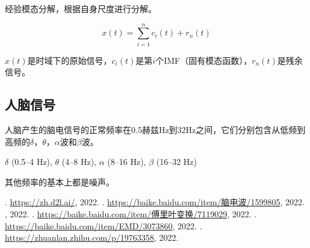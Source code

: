 \documentclass[cs4size,a4paper]{ctexart}
\numberwithin{equation}{section}
\numberwithin{table}{section}
\numberwithin{figure}{section}
\begin{document}
经验模态分解，根据自身尺度进行分解。

$$x(t)=\sum_{i=1}^{n} c_{i}(t)+r_{n}(t)$$

$x(t)$是时域下的原始信号，$c_i(t)$是第$i$个IMF（固有模态函数），$r_n(t)$是残余信号。

\subsection{人脑信号}

人脑产生的脑电信号的正常频率在0.5赫兹Hz到32Hz之间，它们分别包含从低频到高频的$\delta$，$\theta$，$\alpha$波和$\beta$波。

$\delta$ (0.5–4 Hz), $\theta$ (4–8 Hz), $\alpha$ (8–16 Hz), $\beta$ (16–32 Hz)

其他频率的基本上都是噪声。

%
                         
\begin{thebibliography}{99}
. \url{https://zh.d2l.ai/}, 2022.
. \href{https://baike.baidu.com/item/%E8%84%91%E7%94%B5%E6%B3%A2/1599805}{https://baike.baidu.com/item/脑电波/1599805}, 2022.
, 2022.
. \href{https://baike.baidu.com/item/%E5%82%85%E9%87%8C%E5%8F%B6%E5%8F%98%E6%8D%A2/7119029}{https://baike.baidu.com/item/傅里叶变换/7119029}, 2022.
. \href{https://baike.baidu.com/item/EMD/3073860}{https://baike.baidu.com/item/EMD/3073860}, 2022.
. \href{https://zhuanlan.zhihu.com/p/19763358}{https://zhuanlan.zhihu.com/p/19763358}, 2022.

\end{thebibliography}
\end{document}
